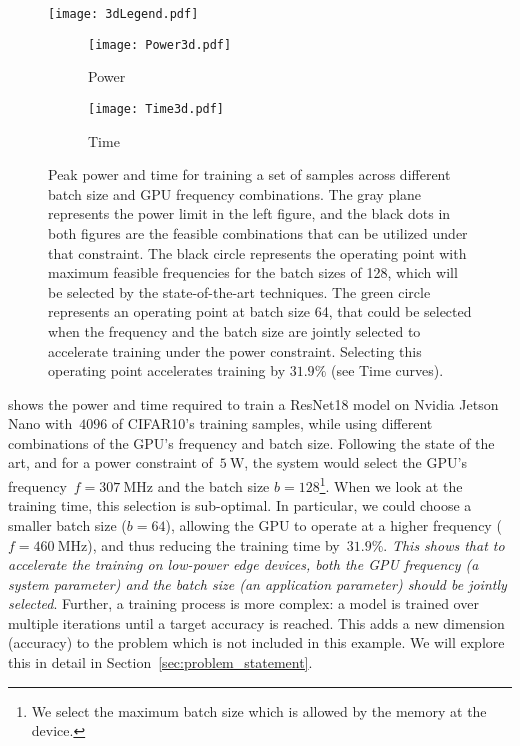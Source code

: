 \begin{figure*}[tb!]
    \centering
    \texttt{[image: 3dLegend.pdf]}
    \begin{subfigure}[b]{0.49\textwidth}
    \centering
        \texttt{[image: Power3d.pdf]}
        \caption{Power}
        \label{fig:3d_power_freq_constraint}
    \end{subfigure}
    \hfill
    \begin{subfigure}[b]{0.49\textwidth}
        \centering
        \texttt{[image: Time3d.pdf]}
        \caption{Time}
        \label{fig:3d_time_freq_constraint}    
    \end{subfigure}
    \caption{Peak power and time for training a set of samples across different batch size and GPU frequency combinations. The gray plane represents the power limit in the left figure, and the black dots in both figures are the feasible combinations that can be utilized under that constraint. The black circle represents the operating point with maximum feasible frequencies for the batch sizes of 128, which will be selected by the state-of-the-art techniques. The green circle represents an operating point at batch size 64, that could be selected when the frequency and the batch size are jointly selected to accelerate training under the power constraint. Selecting this operating point accelerates training by $31.9\%$ (see Time curves).}
    \label{fig:3d_profiling}
    
\end{figure*}

 shows the power and time required to train a ResNet18 model on Nvidia Jetson Nano with~$4096$ of CIFAR10's training samples, while using different combinations of the GPU's frequency and batch size.
Following the state of the art, and for a power constraint of~$\SI{5}{\watt}$, the system would select the GPU's frequency~$f=\SI{307}{\mega\hertz}$ and the batch size $b=128$\footnote{We select the maximum batch size which is allowed by the memory at the device.}. 
When we look at the training time, this selection is sub-optimal. In particular, we could choose a smaller batch size ($b=64$), allowing the GPU to operate at a higher frequency ($f=\SI{460}{\mega\hertz}$), and thus reducing the training time by~$31.9\%$.  
\emph{This shows that to accelerate the training on low-power edge devices, both the GPU frequency (a system parameter) and the batch size (an application parameter) should be jointly selected}. Further, a training process is more complex: a model is trained over multiple iterations until a target accuracy is reached. This adds a new dimension (accuracy) to the problem which is not included in this example. We will explore this in detail in Section~\ref{sec:problem_statement}. 

